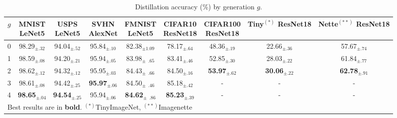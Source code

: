\begin{table}[h] %
    \caption{Distillation accuracy (\%) by generation $g$.}
    \centering
    \begin{tabular}{c|c|c|c|c|c|c|c|c}
        \hline
            $g$
            & \makecell{{MNIST}   \\ LeNet5}
            & \makecell{{USPS}    \\ LeNet5}
            & \makecell{{SVHN}    \\ AlexNet}
            & \makecell{{FMNIST}  \\ LeNet5}
            & \makecell{{CIFAR10} \\ ResNet18}
            & \makecell{{CIFAR100} \\ ResNet18}
            & \makecell{{Tiny$^{(*)}$} \\ ResNet18}
            & \makecell{{Nette$^{(**)}$} \\ ResNet18} \\
        \hline
        0 &          98.29$_{\pm .32}$ &          94.04$_{\pm .52}$ &          95.84$_{\pm .10}$ &                    82.38$_{\pm 1.09}$ &          78.17$_{\pm .64}$ &          48.36$_{\pm .19}$ &          22.66$_{\pm .36}$ &          57.67$_{\pm .74}$ \\
        1 &          98.59$_{\pm .08}$ &          94.20$_{\pm .21}$ &          95.94$_{\pm .05}$ &          83.98$_{\pm \phantom{0}.65}$ &          83.41$_{\pm .46}$ &          52.85$_{\pm .30}$ &          28.03$_{\pm .22}$ &          61.84$_{\pm .77}$ \\
        2 &          98.62$_{\pm .12}$ &          94.32$_{\pm .12}$ &          95.95$_{\pm .03}$ &          84.43$_{\pm \phantom{0}.66}$ &          84.50$_{\pm .16}$ & \textbf{53.97}$_{\pm .62}$ & \textbf{30.06}$_{\pm .22}$ & \textbf{62.78}$_{\pm .91}$ \\
        3 &          98.61$_{\pm .08}$ &          94.42$_{\pm .25}$ & \textbf{95.97}$_{\pm .06}$ &          84.50$_{\pm \phantom{0}.46}$ &          85.18$_{\pm .42}$ & - & - & - \\
        4 & \textbf{98.65}$_{\pm .04}$ & \textbf{94.54}$_{\pm .25}$ &          95.94$_{\pm .06}$ & \textbf{84.62}$_{\pm \phantom{0}.86}$ & \textbf{85.23}$_{\pm .39}$ & - & - & - \\
        \hline
        \multicolumn{9}{l}{Best results are in \textbf{bold}. $^{(*)}$TinyImageNet, $^{(**)}$Imagenette} \\
    \end{tabular}
    \label{tab:abla-ngenerations}
\end{table}
